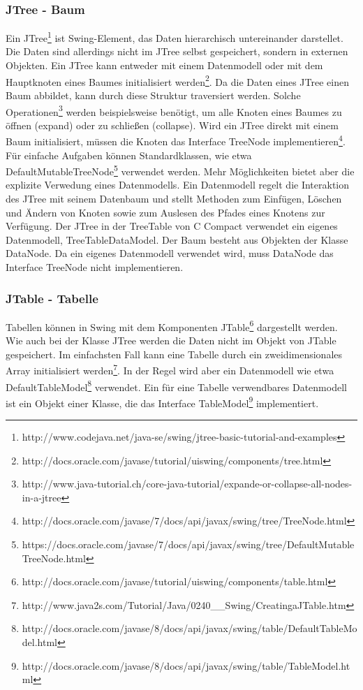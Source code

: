 \subsubsection*{JTree - Baum}
Ein JTree\footnote{http://www.codejava.net/java-se/swing/jtree-basic-tutorial-and-examples} ist Swing-Element, das Daten hierarchisch untereinander darstellet. Die Daten sind allerdings nicht im JTree selbst gespeichert, sondern in externen Objekten. Ein JTree kann entweder mit einem Datenmodell oder mit dem Hauptknoten eines Baumes initialisiert werden\footnote{http://docs.oracle.com/javase/tutorial/uiswing/components/tree.html}. Da die Daten eines JTree einen Baum abbildet, kann durch diese Struktur traversiert werden. Solche Operationen\footnote{http://www.java-tutorial.ch/core-java-tutorial/expande-or-collapse-all-nodes-in-a-jtree} werden beispielsweise benötigt, um alle Knoten eines Baumes zu öffnen (expand) oder zu schließen (collapse).
Wird ein JTree direkt mit einem Baum initialisiert, müssen die Knoten das Interface TreeNode implementieren\footnote{http://docs.oracle.com/javase/7/docs/api/javax/swing/tree/TreeNode.html}. Für einfache Aufgaben können Standardklassen, wie etwa DefaultMutableTreeNode\footnote{https://docs.oracle.com/javase/7/docs/api/javax/swing/tree/DefaultMutableTreeNode.html} verwendet werden.
Mehr Möglichkeiten bietet aber die explizite Verwedung eines Datenmodells. Ein Datenmodell regelt die Interaktion des JTree mit seinem Datenbaum und stellt Methoden zum Einfügen, Löschen und Ändern von Knoten sowie zum Auslesen des Pfades eines Knotens zur Verfügung.
Der JTree in der TreeTable von C Compact verwendet ein eigenes Datenmodell, TreeTableDataModel. Der Baum besteht aus Objekten der Klasse DataNode. Da ein eigenes Datenmodell verwendet wird, muss DataNode das Interface TreeNode nicht implementieren.

\subsubsection*{JTable - Tabelle}
Tabellen können in Swing mit dem Komponenten JTable\footnote{http://docs.oracle.com/javase/tutorial/uiswing/components/table.html} dargestellt werden. Wie auch bei der Klasse JTree werden die Daten nicht im Objekt von JTable gespeichert. Im einfachsten Fall kann eine Tabelle durch ein zweidimensionales Array initialisiert werden\footnote{http://www.java2s.com/Tutorial/Java/0240\_\_Swing/CreatingaJTable.htm}. In der Regel wird aber ein Datenmodell wie etwa DefaultTableModel\footnote{http://docs.oracle.com/javase/8/docs/api/javax/swing/table/DefaultTableModel.html} verwendet. Ein für eine Tabelle verwendbares Datenmodell ist ein Objekt einer Klasse, die das Interface TableModel\footnote{http://docs.oracle.com/javase/8/docs/api/javax/swing/table/TableModel.html} implementiert.

